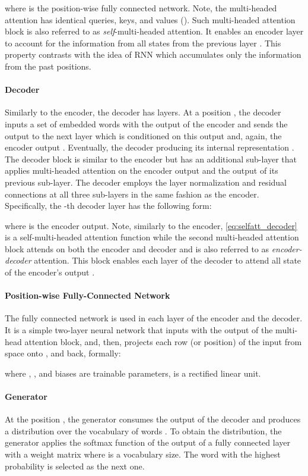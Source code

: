 \documentclass[10pt,twocolumn,letterpaper]{article}
\begin{document}
where  is the position-wise fully connected network. Note, the multi-headed attention has identical queries, keys, and values (). Such multi-headed attention block is also referred to as \textit{self}-multi-headed attention. It enables an encoder layer  to account for the information from all states from the previous layer . This property contrasts with the idea of RNN which accumulates only the information from the past positions. 

\paragraph{Decoder} 
Similarly to the encoder, the decoder has  layers. At a position , the decoder inputs a set of embedded words  with the output of the encoder  and sends the output to the next layer which is conditioned on this output and, again, the encoder output . Eventually, the decoder producing its internal representation . The decoder block is similar to the encoder but has an additional sub-layer that applies multi-headed attention on the encoder output and the output of its previous sub-layer. The decoder employs the layer normalization and residual connections at all three sub-layers in the same fashion as the encoder. Specifically, the -th decoder layer has the following form:

where  is the encoder output. Note, similarly to the encoder, \eqref{eq:selfatt_decoder} is a self-multi-headed attention function while the second multi-headed attention block attends on both the encoder and decoder and is also referred to as \textit{encoder-decoder} attention. This block enables each layer of the decoder to attend all state of the encoder's output .

\paragraph{Position-wise Fully-Connected Network} 
The fully connected network is used in each layer of the encoder and the decoder. It is a simple two-layer neural network that inputs  with the output of the multi-head attention block, and, then, projects each row (or position) of the input  from  space onto ,  and back, formally:

where , , and biases  are trainable parameters,  is a rectified linear unit.

\paragraph{Generator} 
At the position , the generator consumes the output of the decoder  and produces a distribution over the vocabulary of words . To obtain the distribution, the generator applies the softmax function of the output of a fully connected layer with a weight matrix  where  is a vocabulary size. The word with the highest probability is selected as the next one.
\end{document}
